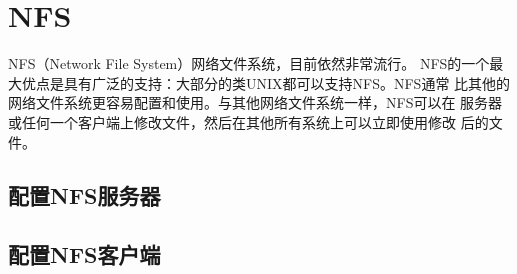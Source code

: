 \section{NFS}
\label{sec:NFS}

NFS（Network File System）网络文件系统，目前依然非常流行。
NFS的一个最大优点是具有广泛的支持：大部分的类UNIX都可以支持NFS。NFS通常
比其他的网络文件系统更容易配置和使用。与其他网络文件系统一样，NFS可以在
服务器或任何一个客户端上修改文件，然后在其他所有系统上可以立即使用修改
后的文件。

\subsection{配置NFS服务器}

\subsection{配置NFS客户端}

